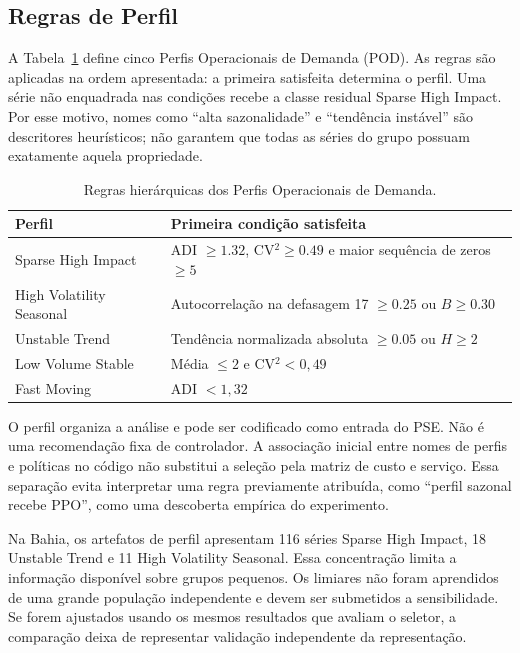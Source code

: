 \subsection{Regras de Perfil}

A Tabela~\ref{tab:pod} define cinco Perfis Operacionais de Demanda (POD). As regras são aplicadas na ordem apresentada: a primeira satisfeita determina o perfil. Uma série não enquadrada nas condições recebe a classe residual Sparse High Impact. Por esse motivo, nomes como ``alta sazonalidade'' e ``tendência instável'' são descritores heurísticos; não garantem que todas as séries do grupo possuam exatamente aquela propriedade.

\begin{table}[htbp]
\centering\small
\caption{Regras hierárquicas dos Perfis Operacionais de Demanda.}\label{tab:pod}
\begin{tabular}{lp{8cm}}
\toprule
Perfil & Primeira condição satisfeita\\
\midrule
Sparse High Impact & ADI $\geq1.32$, CV$^2\geq0.49$ e maior sequência de zeros $\geq5$\\
High Volatility Seasonal & Autocorrelação na defasagem 17 $\geq0.25$ ou $B\geq0.30$\\
Unstable Trend & Tendência normalizada absoluta $\geq0.05$ ou $H\geq2$\\
Low Volume Stable & Média $\leq2$ e CV$^2<0{,}49$\\
Fast Moving & ADI $<1{,}32$\\
\bottomrule
\end{tabular}
\end{table}

O perfil organiza a análise e pode ser codificado como entrada do PSE. Não é uma recomendação fixa de controlador. A associação inicial entre nomes de perfis e políticas no código não substitui a seleção pela matriz de custo e serviço. Essa separação evita interpretar uma regra previamente atribuída, como ``perfil sazonal recebe PPO'', como uma descoberta empírica do experimento.

Na Bahia, os artefatos de perfil apresentam 116 séries Sparse High Impact, 18 Unstable Trend e 11 High Volatility Seasonal. Essa concentração limita a informação disponível sobre grupos pequenos. Os limiares não foram aprendidos de uma grande população independente e devem ser submetidos a sensibilidade. Se forem ajustados usando os mesmos resultados que avaliam o seletor, a comparação deixa de representar validação independente da representação.

